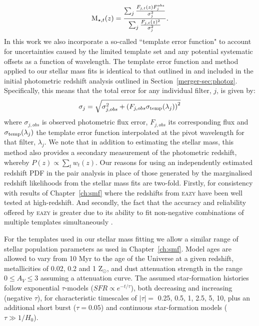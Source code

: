 \begin{equation}\label{eq:temp_norm}
	\textup{M}_{\star,t}(z) = 
\frac{\sum_{j} \frac{F_{j,t}(z)F_{j}^{obs}}{\sigma^{2}_{j}} }  { \sum_{j} \frac{F_{j,t}(z)^{2}}{\sigma^{2}_{j}}  }.
\end{equation}
In this work we also incorporate a so-called ``template error function" to account for uncertainties caused by the limited template set and any potential systematic offsets as a function of wavelength. The template error function and method applied to our stellar mass fits is identical to that outlined in \citet{Brammer:2008gn} and included in the initial photometric redshift analysis outlined in Section~\ref{merger-sec:photoz}. Specifically, this means that the total error for any individual filter, $j$, is given by:
\begin{equation}
	\sigma_{j} = \sqrt{\sigma_{j,obs}^{2} + \left ( F_{j,obs}\sigma_{\textup{temp}}(\lambda_{j}) \right )^{2} }
\end{equation}
where $\sigma_{j,obs}$ is observed photometric flux error, $F_{j,obs}$ its corresponding flux and $\sigma_{\textup{temp}}(\lambda_{j})$ the template error function interpolated at the pivot wavelength for that filter, $\lambda_{j}$. We note that in addition to estimating the stellar mass, this method also provides a secondary measurement of the photometric redshift, whereby \(P(z) \propto \sum_{t} w_{t}(z) \). Our reasons for using an independently estimated redshift PDF in the pair analysis in place of those generated by the marginalised redshift likelihoods from the stellar mass fits are two-fold. Firstly, for consistency with results of Chapter~\ref{ch:smf} where the redshifts from \textsc{eazy} have been well tested at high-redshift. And secondly, the fact that the accuracy and reliability offered by \textsc{eazy} is greater due to its ability to fit non-negative combinations of multiple templates simultaneously \citep{Brammer:2008gn,Dahlen:2013eu}.

For the \citet{Bruzual:2003ckb} templates used in our stellar mass fitting we allow a similar range of stellar population parameters as used in Chapter~\ref{ch:smf}. Model ages are allowed to vary from 10 Myr to the age of the Universe at a given redshift, metallicities of 0.02, 0.2 and 1 Z$_{\odot}$, and dust attenuation strength in the range $0 \le A_{V} \le 3$ assuming a \citet{2000ApJ...533..682C} attenuation curve. The assumed star-formation histories follow exponential $\tau$-models ($SFR \propto e^{-t/\tau}$), both decreasing and increasing (negative $\tau$), for characteristic timescales of $\left | \tau \right | = $ 0.25, 0.5, 1, 2.5, 5, 10, plus an additional short burst ($\tau = 0.05$) and continuous star-formation models ($\tau \gg1/H_{0}$). 

